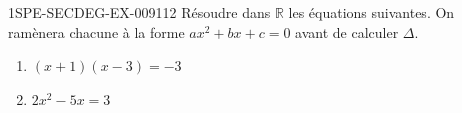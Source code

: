 \begin{exercice}{1SPE-SECDEG-EX-009}{1}{12}
Résoudre dans $\mathbb{R}$ les équations suivantes. On ramènera chacune à la forme $ax^2 + bx + c = 0$ avant de calculer $\Delta$.

\begin{enumerate}
  \item $(x+1)(x-3) = -3$
  \item $2x^2 - 5x = 3$
\end{enumerate}
\end{exercice}
